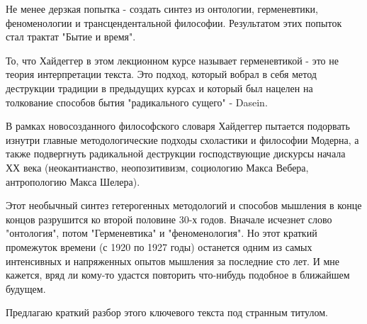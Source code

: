 Не менее дерзкая попытка - создать синтез из онтологии, герменевтики,
феноменологии и трансцендентальной философии. Результатом этих попыток стал
трактат "Бытие и время". 

То, что Хайдеггер в этом лекционном курсе называет герменевтикой - это не
теория интерпретации текста. Это подход, который вобрал в себя метод деструкции
традиции в предыдущих курсах и который был нацелен на толкование способов бытия
"радикального сущего" - Dasein. 

В рамках новосозданного философского словаря Хайдеггер пытается подорвать
изнутри главные методологические подходы схоластики и философии Модерна, а
также подвергнуть радикальной деструкции  господствующие дискурсы начала ХХ
века (неокантианство, неопозитивизм, социологию Макса Вебера, антропологию
Макса Шелера). 

Этот необычный синтез гетерогенных методологий и способов мышления в конце
концов разрушится ко второй половине 30-х годов. Вначале исчезнет слово
"онтология", потом "Герменевтика" и "феноменология". Но этот краткий промежуток
времени (с 1920 по 1927 годы) останется одним из самых интенсивных и
напряженных опытов мышления за последние сто лет. И мне кажется, вряд ли
кому-то удастся повторить что-нибудь подобное в ближайшем будущем. 

Предлагаю краткий разбор этого ключевого текста под странным титулом.
